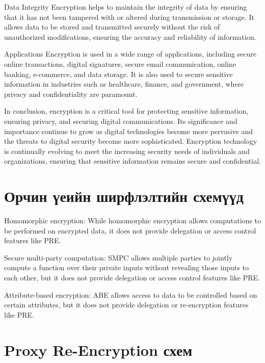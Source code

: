 Data Integrity
Encryption helps to maintain the integrity of data by ensuring that it has not been tampered with or altered during transmission or storage. It allows data to be stored and transmitted securely without the risk of unauthorized modifications, ensuring the accuracy and reliability of information.

Applications
Encryption is used in a wide range of applications, including secure online transactions, digital signatures, secure email communication, online banking, e-commerce, and data storage. It is also used to secure sensitive information in industries such as healthcare, finance, and government, where privacy and confidentiality are paramount.

In conclusion, encryption is a critical tool for protecting sensitive information, ensuring privacy, and securing digital communications. Its significance and importance continue to grow as digital technologies become more pervasive and the threats to digital security become more sophisticated. Encryption technology is continually evolving to meet the increasing security needs of individuals and organizations, ensuring that sensitive information remains secure and confidential.
\section{Орчин үеийн ширфлэлтийн схемүүд}
Homomorphic encryption: While homomorphic encryption allows computations to be performed on encrypted data, it does not provide delegation or access control features like PRE.

Secure multi-party computation: SMPC allows multiple parties to jointly compute a function over their private inputs without revealing those inputs to each other, but it does not provide delegation or access control features like PRE.

Attribute-based encryption: ABE allows access to data to be controlled based on certain attributes, but it does not provide delegation or re-encryption features like PRE.
\section{Proxy Re-Encryption схем}

